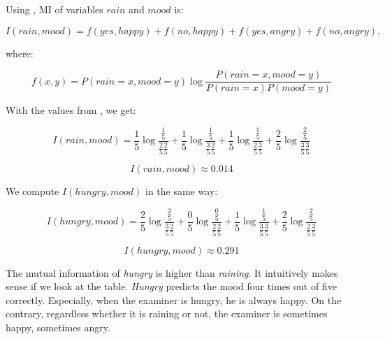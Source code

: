 Using , MI of variables $\mathit{rain}$ and $\mathit{mood}$ is:


\begin{equation}
	I(\mathit{rain}, \mathit{mood}) =
	f(yes, happy) + f(no, happy) + f(yes, angry) + f(no, angry),
\end{equation}

where:

\begin{equation}
	f(x, y) = P(rain=x,mood=y)\log\frac{P(rain=x,mood=y)}{P(rain=x)P(mood=y)}
\end{equation}


With the values from , we get:

\begin{equation}
	I(\mathit{rain}, \mathit{mood}) =
	\frac{1}{5}
		\log \frac{
	\frac{1}{5}
	}{
	\frac{2}{5}
	\frac{2}{5}
	} +
%
	\frac{1}{5}
		\log \frac{
	\frac{1}{5}
	}{
	\frac{3}{5}
	\frac{2}{5}
	} +
%
	\frac{1}{5}
		\log \frac{
	\frac{1}{5}
	}{
	\frac{2}{5}
	\frac{3}{5}
	} +
%
	\frac{2}{5}
		\log \frac{
	\frac{2}{5}
	}{
	\frac{3}{5}
	\frac{3}{5}
	}
\end{equation}

\begin{equation}
	I(\mathit{rain}, \mathit{mood}) \approx 0.014
\end{equation}

We compute $I(\mathit{hungry}, \mathit{mood})$ in the same way:

\begin{equation}
	I(\mathit{hungry}, \mathit{mood}) =
	\frac{2}{5}
		\log \frac{
	\frac{2}{5}
	}{
	\frac{3}{5}
	\frac{2}{5}
	} +
%
	\frac{0}{5}
		\log \frac{
	\frac{0}{5}
	}{
	\frac{2}{5}
	\frac{2}{5}
	} +
%
	\frac{1}{5}
		\log \frac{
	\frac{1}{5}
	}{
	\frac{3}{5}
	\frac{3}{5}
	} +
%
	\frac{2}{5}
		\log \frac{
	\frac{2}{5}
	}{
	\frac{2}{5}
	\frac{3}{5}
	}
\end{equation}

\begin{equation}
	I(\mathit{hungry}, \mathit{mood}) \approx 0.291
\end{equation}

The mutual information of \textit{hungry} is higher than \textit{raining}.
It intuitively makes sense if we look at the table.
\textit{Hungry} predicts the mood four times out of five correctly.
Especially, when the examiner is hungry, he is always happy.
On the contrary, regardless whether it is raining or not, the examiner
is sometimes happy, sometimes angry.

